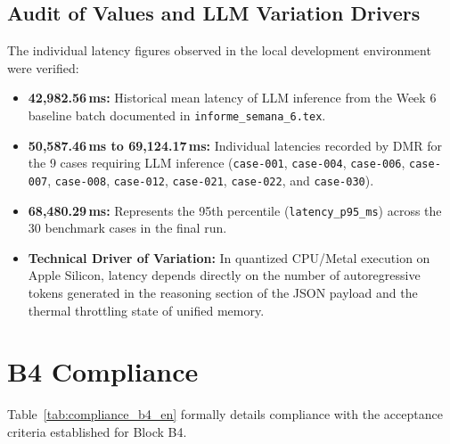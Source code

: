 \documentclass[11pt,a4paper]{article}
\begin{document}
\subsection{Audit of Values and LLM Variation Drivers}
The individual latency figures observed in the local development environment were verified:
\begin{itemize}[leftmargin=*]
    \item \textbf{42,982.56\,ms:} Historical mean latency of LLM inference from the Week 6 baseline batch documented in \texttt{informe\_semana\_6.tex}.
    \item \textbf{50,587.46\,ms to 69,124.17\,ms:} Individual latencies recorded by DMR for the 9 cases requiring LLM inference (\texttt{case-001}, \texttt{case-004}, \texttt{case-006}, \texttt{case-007}, \texttt{case-008}, \texttt{case-012}, \texttt{case-021}, \texttt{case-022}, and \texttt{case-030}).
    \item \textbf{68,480.29\,ms:} Represents the 95th percentile (\texttt{latency\_p95\_ms}) across the 30 benchmark cases in the final run.
    \item \textbf{Technical Driver of Variation:} In quantized CPU/Metal execution on Apple Silicon, latency depends directly on the number of autoregressive tokens generated in the reasoning section of the JSON payload and the thermal throttling state of unified memory.
\end{itemize}

\section{B4 Compliance}
Table~\ref{tab:compliance_b4_en} formally details compliance with the acceptance criteria established for Block B4.
\end{document}
